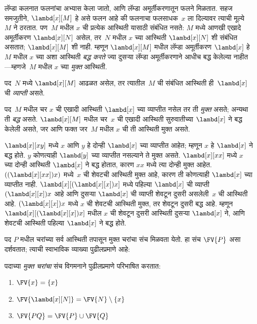 \documentclass[../../../include/open-logic-section]{subfiles}
\begin{document}

लॅम्डा कलनात फलनांचा अभ्यास केला जातो, आणि लॅम्डा अमूर्तीकरणातून
फलने मिळतात. सहज समजुतीने, $\lambd[x][M]$ हे असे फलन आहे की
फलनाचा फलसाधक~$x$ ला दिल्यावर त्याची मूल्ये~$M$ ने
ठरतात. पण~$M$ मधील $x$ ची प्रत्येक आस्थिती यासाठी संबंधित नसते:
$M$ मध्ये आणखी एखादे अमूर्तीकरण $\lambd[x][N]$ असेल, तर~$N$
मधील $x$ च्या आस्थिती $\lambd[x][N]$ शी संबंधित असतात;
$\lambd[x][M]$ शी नाही. म्हणून $\lambd[x][M]$ मधील
लॅम्डा अमूर्तीकरण $\lambd[x]$ हे~$M$ मधील $x$ च्या अशा
आस्थिती \emph{बद्ध करते} ज्या दुसऱ्या लॅम्डा अमूर्तीकरणाने
आधीच बद्ध केलेल्या नाहीत---म्हणजे~$M$ मधील $x$ च्या
\emph{मुक्त} आस्थिती.

\begin{defn}[व्याप्ती]
पद~$N$ मध्ये $\lambd[x][M]$ आढळत असेल, तर त्यातील~$M$
ची संबंधित आस्थिती ही~$\lambd[x]$ ची
\emph{व्याप्ती} असते.
\end{defn}


\begin{defn}[मुक्त आणि बद्ध आस्थिती]
  पद~$M$ मधील चर $x$ ची एखादी आस्थिती $\lambd[x]$ च्या
  व्याप्तीत नसेल तर ती \emph{मुक्त} असते; अन्यथा ती
  \emph{बद्ध} असते. $\lambd[x][M]$ मधील चर~$x$ ची
  एखादी आस्थिती सुरुवातीच्या $\lambd[x]$ ने बद्ध केलेली
  असते, जर आणि फक्त जर~$M$ मधील $x$ ची ती आस्थिती मुक्त असते.
\end{defn}

\begin{ex}
  $\lambd[x][x y]$ मध्ये $x$ आणि $y$ हे दोन्ही $\lambd[x]$
  च्या व्याप्तीत आहेत; म्हणून $x$ हे $\lambd[x]$ ने बद्ध होते.
  $y$ कोणत्याही $\lambd[y]$ च्या व्याप्तीत नसल्याने ते मुक्त
  असते. $\lambd[x][x x]$ मध्ये $x$ च्या दोन्ही आस्थिती
  $\lambd[x]$ ने बद्ध होतात, कारण $xx$ मध्ये त्या दोन्ही मुक्त
  आहेत. $((\lambd[x][xx])x)$ मध्ये~$x$ ची शेवटची आस्थिती
  मुक्त आहे, कारण ती कोणत्याही $\lambd[x]$ च्या व्याप्तीत नाही.
  $\lambd[x][(\lambd[x][x])x]$ मध्ये पहिल्या $\lambd[x]$
  ची व्याप्ती $(\lambd[x][x])x$ आहे आणि दुसऱ्या $\lambd[x]$
  ची व्याप्ती शेवटून दुसरी असलेली~$x$ ची आस्थिती आहे.
  $(\lambd[x][x])x$ मध्ये $x$ ची शेवटची आस्थिती मुक्त,
  तर शेवटून दुसरी बद्ध आहे. म्हणून
  $\lambd[x][(\lambd[x][x])x]$ मधील $x$ ची शेवटून दुसरी
  आस्थिती दुसऱ्या $\lambd[x]$ ने, आणि शेवटची आस्थिती
  पहिल्या $\lambd[x]$ ने बद्ध होते.
\end{ex}

पद $P$ मधील चरांच्या सर्व आस्थिती तपासून मुक्त चरांचा संच
मिळवता येतो. हा संच $\FV{P}$ असा दर्शवतात; त्याची
स्वाभाविक व्याख्या पुढीलप्रमाणे आहे:

\begin{defn}[पदाचे मुक्त चरे] 
  पदाच्या \emph{मुक्त चरांचा} संच विगमनाने पुढीलप्रमाणे परिभाषित करतात:
  \begin{enumerate}
    \item $\FV{x} = \{x\}$ 
    \item $\FV{\lambd[x][N]} = \FV{N} \setminus \{x\}$ 
    \item $\FV{PQ} = \FV{P} \cup \FV{Q}$ 
  \end{enumerate}
\end{defn}
\end{document}
